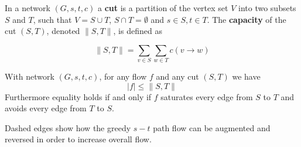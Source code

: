 \begin{defn}\label{networkcut}
In a network $(G, s, t, c)$ a \textbf{cut} is a partition of the vertex set $V$ into two subsets $S$ and $T$, such that $V = S \cup T$, $S \cap T = \emptyset$ and $s \in S, t \in T$. The \textbf{capacity} of the cut $(S, T)$, denoted $\|S,T\|$, is defined as

$$
\|S, T\| = \sum_{v \in S} \sum_{w \in T} c(v \rightarrow w)
$$
\end{defn}

\begin{thm}\label{flowcut}
With network $(G, s, t, c)$, for any flow $f$ and any cut $(S, T)$ we have
$$
  |f| \leq \|S, T\|
$$
Furthermore equality holds if and only if $f$ saturates every edge from $S$ to $T$ and avoids every edge from $T$ to $S$.
\end{thm}

\begin{marginfigure}[1in]
    \caption{Dashed edges show how the greedy $s-t$ path flow can be augmented and reversed in order to increase overall flow.}
	\label{ex_flow_dashed}
\end{marginfigure}

